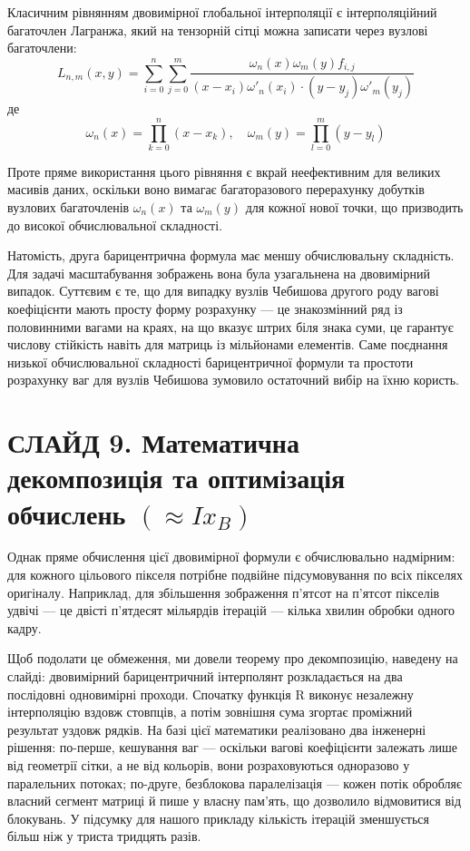 \documentclass[12pt,a4paper]{article}
\begin{document}
Класичним рівнянням двовимірної глобальної інтерполяції є інтерполяційний багаточлен Лагранжа, який на тензорній сітці можна записати через вузлові багаточлени:
	\begin{equation}
		L_{n, m}(x, y) = \sum_{i=0}^{n} \sum_{j=0}^{m} \frac{\omega_n(x) \omega_m(y) f_{i, j}}{(x-x_i) \omega'_n(x_i) \cdot (y-y_j) \omega'_m(y_j)}
	\end{equation}
	де 
	\begin{equation}
		\omega_n(x) = \prod_{k=0}^{n}(x-x_k), \quad \omega_m(y) = \prod_{l=0}^{m}(y-y_l)
	\end{equation}
	
Проте пряме використання цього рівняння є вкрай неефективним для великих масивів даних, оскільки воно вимагає багаторазового перерахунку добутків вузлових багаточленів $\omega_n(x)$ та $\omega_m(y)$ для кожної нової точки, що призводить до високої обчислювальної складності.

	Натомість, друга барицентрична формула має меншу обчислювальну складність. Для задачі масштабування зображень вона була узагальнена  на двовимірний випадок. Суттєвим є те, що для випадку вузлів Чебишова другого роду вагові коефіцієнти мають просту форму розрахунку — це знакозмінний ряд із половинними вагами на краях, на що вказує штрих біля знака суми, це гарантує числову стійкість навіть для матриць із мільйонами елементів. Саме поєднання низької обчислювальної складності барицентричної формули та простоти розрахунку ваг для вузлів Чебишова зумовило остаточний вибір на їхню користь.
	
	\section*{СЛАЙД 9. Математична декомпозиція та оптимізація обчислень $(\approx Ix_{B})$}
	Однак пряме обчислення цієї двовимірної формули є обчислювально надмірним: для кожного цільового пікселя потрібне подвійне підсумовування по всіх пікселях оригіналу. Наприклад, для збільшення зображення п'ятсот на п'ятсот пікселів удвічі — це двісті п'ятдесят мільярдів ітерацій — кілька хвилин обробки одного кадру.
	
	Щоб подолати це обмеження, ми довели теорему про декомпозицію, наведену на слайді: двовимірний барицентричний інтерполянт розкладається на два послідовні одновимірні проходи. Спочатку функція R виконує незалежну інтерполяцію вздовж стовпців, а потім зовнішня сума згортає проміжний результат уздовж рядків. На базі цієї математики реалізовано два інженерні рішення: по-перше, кешування ваг — оскільки вагові коефіцієнти залежать лише від геометрії сітки, а не від кольорів, вони розраховуються одноразово у паралельних потоках; по-друге, безблокова паралелізація — кожен потік обробляє власний сегмент матриці й пише у власну пам'ять, що дозволило відмовитися від блокувань. У підсумку для нашого прикладу кількість ітерацій зменшується більш ніж у триста тридцять разів.
	
\end{document}
